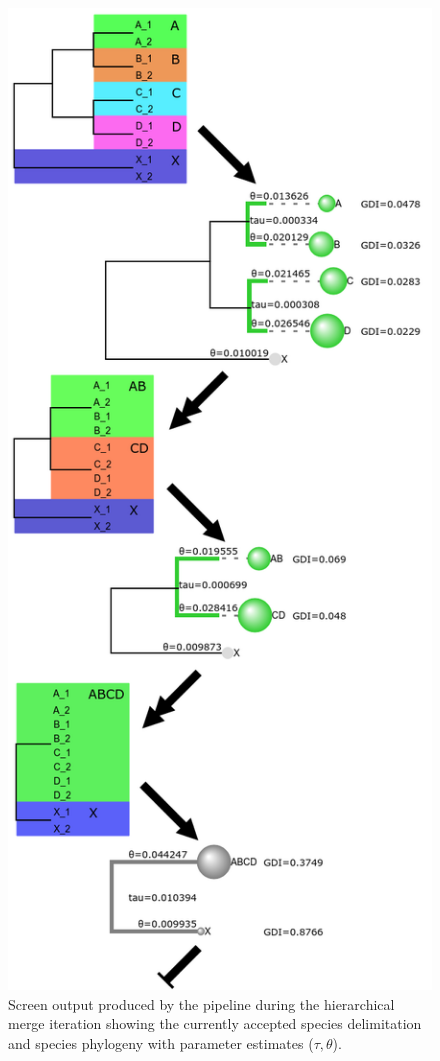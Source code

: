 \documentclass{article1}
\begin{document}
\begin{figure}[t]
	\centering %
	\includegraphics[scale=0.30]{figs/Pipedemo/sim_fig_v1} %
	
   \caption{Screen output produced by the pipeline during the hierarchical merge iteration
   showing the currently accepted species delimitation and species phylogeny with
   parameter estimates ($\tau, \theta$). %
   } \label{fig:ABCDX_out}
\end{figure}
\end{document}
